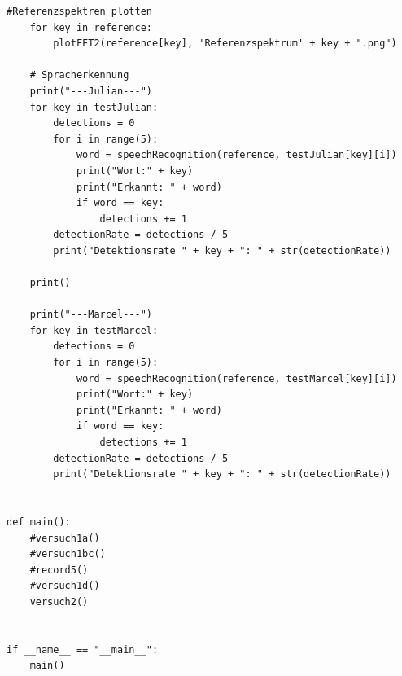 \documentclass[12pt,oneside,a4paper]{report}
\begin{document}
\begin{lstlisting}[style=PYTHON, frame=single, caption=QuellCodeV1 bis V2, captionpos=b, label=lst:Code]
    #Referenzspektren plotten
    for key in reference:
        plotFFT2(reference[key], 'Referenzspektrum' + key + ".png")
    
    # Spracherkennung
    print("---Julian---")
    for key in testJulian:
        detections = 0
        for i in range(5):
            word = speechRecognition(reference, testJulian[key][i])
            print("Wort:" + key)
            print("Erkannt: " + word)
            if word == key:
                detections += 1
        detectionRate = detections / 5
        print("Detektionsrate " + key + ": " + str(detectionRate))

    print()

    print("---Marcel---")
    for key in testMarcel:
        detections = 0
        for i in range(5):
            word = speechRecognition(reference, testMarcel[key][i])
            print("Wort:" + key)
            print("Erkannt: " + word)
            if word == key:
                detections += 1
        detectionRate = detections / 5
        print("Detektionsrate " + key + ": " + str(detectionRate))


def main():
    #versuch1a()
    #versuch1bc()
    #record5()
    #versuch1d()
    versuch2()


if __name__ == "__main__":
    main()

\end{lstlisting}

%
%

\end{document}
